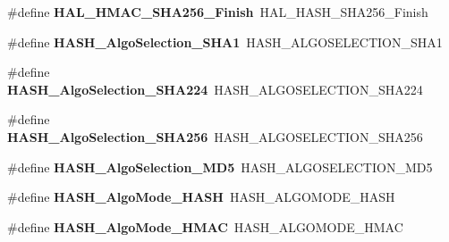 \begin{DoxyCompactItemize}
\item 
\hypertarget{group___h_a_l___h_a_s_h___aliased___functions_gaac86fd19acf8548fc6754c19e723d9f7}{\#define {\bfseries H\-A\-L\-\_\-\-H\-M\-A\-C\-\_\-\-S\-H\-A256\-\_\-\-Finish}~H\-A\-L\-\_\-\-H\-A\-S\-H\-\_\-\-S\-H\-A256\-\_\-\-Finish}\label{group___h_a_l___h_a_s_h___aliased___functions_gaac86fd19acf8548fc6754c19e723d9f7}

\item 
\hypertarget{group___h_a_l___h_a_s_h___aliased___functions_gaa866d6ac9e86d2290b012681836f22d0}{\#define {\bfseries H\-A\-S\-H\-\_\-\-Algo\-Selection\-\_\-\-S\-H\-A1}~H\-A\-S\-H\-\_\-\-A\-L\-G\-O\-S\-E\-L\-E\-C\-T\-I\-O\-N\-\_\-\-S\-H\-A1}\label{group___h_a_l___h_a_s_h___aliased___functions_gaa866d6ac9e86d2290b012681836f22d0}

\item 
\hypertarget{group___h_a_l___h_a_s_h___aliased___functions_gaf8b9faddbf24e087ec70742275a16e97}{\#define {\bfseries H\-A\-S\-H\-\_\-\-Algo\-Selection\-\_\-\-S\-H\-A224}~H\-A\-S\-H\-\_\-\-A\-L\-G\-O\-S\-E\-L\-E\-C\-T\-I\-O\-N\-\_\-\-S\-H\-A224}\label{group___h_a_l___h_a_s_h___aliased___functions_gaf8b9faddbf24e087ec70742275a16e97}

\item 
\hypertarget{group___h_a_l___h_a_s_h___aliased___functions_ga4dd93835c16dcffba7e303a2412d58ad}{\#define {\bfseries H\-A\-S\-H\-\_\-\-Algo\-Selection\-\_\-\-S\-H\-A256}~H\-A\-S\-H\-\_\-\-A\-L\-G\-O\-S\-E\-L\-E\-C\-T\-I\-O\-N\-\_\-\-S\-H\-A256}\label{group___h_a_l___h_a_s_h___aliased___functions_ga4dd93835c16dcffba7e303a2412d58ad}

\item 
\hypertarget{group___h_a_l___h_a_s_h___aliased___functions_gac443db7ebfff6d660b9321c59ecf48ed}{\#define {\bfseries H\-A\-S\-H\-\_\-\-Algo\-Selection\-\_\-\-M\-D5}~H\-A\-S\-H\-\_\-\-A\-L\-G\-O\-S\-E\-L\-E\-C\-T\-I\-O\-N\-\_\-\-M\-D5}\label{group___h_a_l___h_a_s_h___aliased___functions_gac443db7ebfff6d660b9321c59ecf48ed}

\item 
\hypertarget{group___h_a_l___h_a_s_h___aliased___functions_ga4de18ef48bad8fe403226abe769bd921}{\#define {\bfseries H\-A\-S\-H\-\_\-\-Algo\-Mode\-\_\-\-H\-A\-S\-H}~H\-A\-S\-H\-\_\-\-A\-L\-G\-O\-M\-O\-D\-E\-\_\-\-H\-A\-S\-H}\label{group___h_a_l___h_a_s_h___aliased___functions_ga4de18ef48bad8fe403226abe769bd921}

\item 
\hypertarget{group___h_a_l___h_a_s_h___aliased___functions_ga70224c1ea0eef2f45363f92fc001a875}{\#define {\bfseries H\-A\-S\-H\-\_\-\-Algo\-Mode\-\_\-\-H\-M\-A\-C}~H\-A\-S\-H\-\_\-\-A\-L\-G\-O\-M\-O\-D\-E\-\_\-\-H\-M\-A\-C}\label{group___h_a_l___h_a_s_h___aliased___functions_ga70224c1ea0eef2f45363f92fc001a875}


\end{DoxyCompactItemize}
